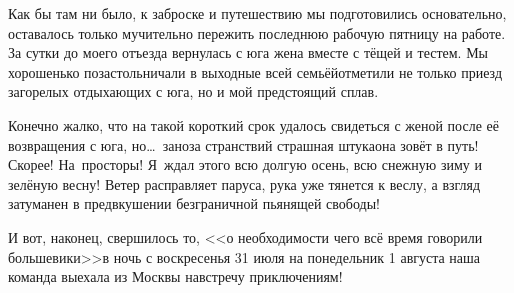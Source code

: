 Как бы там ни было, к заброске и путешествию мы подготовились основательно, оставалось  только мучительно пережить последнюю рабочую пятницу на работе. За сутки до моего отъезда вернулась с юга жена вместе с тёщей и тестем. Мы хорошенько позастольничали в выходные всей семьёй\mdash отметили не только приезд загорелых отдыхающих с юга, но и мой предстоящий сплав. 

Конечно жалко, что на такой короткий срок удалось свидеться с женой после её возвращения с юга, но\ldots~заноза странствий страшная штука\mdash она зовёт в путь! Скорее! На~просторы! Я~ждал этого всю долгую осень, всю снежную зиму и зелёную весну! Ветер расправляет паруса, рука уже тянется к веслу, а взгляд затуманен в предвкушении безграничной пьянящей свободы!

И вот, наконец, свершилось то, <<о необходимости чего всё время говорили большевики>>\mdash  в ночь с воскресенья 31 июля на понедельник 1 августа наша команда выехала из Москвы навстречу приключениям!

\begin{center}
\end{center}
